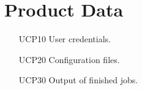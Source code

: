 \section{Product Data}
\begin{itemize}
  \item [UCP10] User credentials.
  \item [UCP20] Configuration files.
  \item [UCP30] Output of finished jobs.
\end{itemize}
